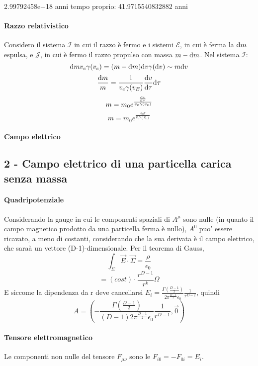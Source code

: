 2.99792458e+18  anni
tempo proprio:
41.9715540832882 anni




\paragraph{Razzo relativistico}
Considero il sistema $\mathcal{I}$ in cui il razzo \`e fermo e i sistemi $\mathcal{E}$, in cui \`e ferma la $\mathrm{d} m$ espulsa, e $\mathcal{J}$, in cui \`e fermo il razzo propulso con massa $m-\mathrm{d} m$. Nel sistema $\mathcal{I}$:
\[ \mathrm{d} m v_e \gamma(v_e) = (m - \mathrm{d} m) \mathrm{d} v \gamma(\mathrm{d} v) \sim m \mathrm{d} v \]
\[ \frac{\mathrm{d} m}{m} = \frac{1}{v_e \gamma(v_E)} \frac{\mathrm{d} v}{\mathrm{d}\tau} \mathrm{d}\tau \]
\[ m = m_0 e^{\frac{\frac{\mathrm{d} v}{\mathrm{d}\tau}}{v_e \gamma(v_e) }} \]
\[ m = m_0 e^{\frac{a_0\tau}{v_e \gamma(v_e) }} \]

\paragraph{Campo elettrico}





\subsection{2 - Campo elettrico di una particella carica senza massa}
\paragraph{Quadripotenziale}
Considerando la gauge in cui le componenti spaziali di $A^\mu$ sono nulle (in quanto il campo magnetico prodotto da una particella ferma \`e nullo), $A^0$ puo' essere ricavato, a meno di costanti, considerando che la sua derivata \`e il campo elettrico, che sara\`a un vettore (D-1)-dimensionale. Per il teorema di Gauss,
\[ \int_\Sigma \vec{E}\cdot\vec{\Sigma} = \frac{\rho}{\epsilon_0} \]
\[ =  (cost) \cdot \frac{r^{D-1}}{r^k}\Omega \]
E siccome la dipendenza da r deve cancellarsi \( E_i = \frac{\Gamma(\frac{D-1}{2})}{2\pi^{\frac{D-1}{2}}\epsilon_0} \frac{1}{r^{D-2}} \), quindi
\[ A = (-\frac{\Gamma(\frac{D-1}{2})}{(D-1)2\pi^{\frac{D-1}{2}}\epsilon_0} \frac{1}{r^{D-1}},\vec{0}) \]
\paragraph{Tensore elettromagnetico}
Le componenti non nulle del tensore $F_{\mu\nu}$ sono le $F_{i0}=-F_{0i}=E_i$.

